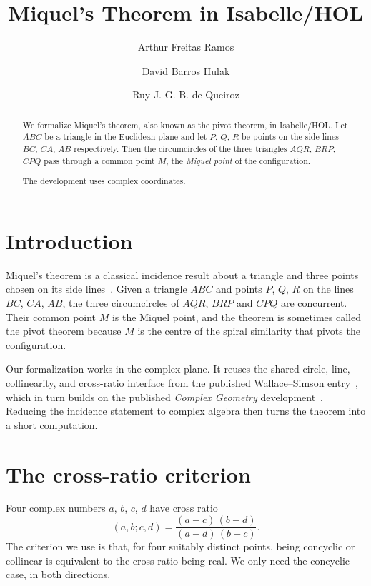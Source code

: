 \documentclass[11pt,a4paper]{article}
\begin{document}
\title{Miquel's Theorem in Isabelle/HOL}
\author{Arthur Freitas Ramos \and David Barros Hulak \and Ruy J. G. B. de Queiroz}
\maketitle

\begin{abstract}
We formalize Miquel's theorem, also known as the pivot theorem, in
Isabelle/HOL.  Let \(ABC\) be a
triangle in the Euclidean plane and let \(P\), \(Q\), \(R\) be points on the
side lines \(BC\), \(CA\), \(AB\) respectively.  Then the circumcircles of the
three triangles \(AQR\), \(BRP\), \(CPQ\) pass through a common point \(M\),
the \emph{Miquel point} of the configuration.

The development uses complex coordinates.
\end{abstract}

\tableofcontents

\section{Introduction}

Miquel's theorem is a classical incidence result about a triangle and three
points chosen on its side lines~\cite{miquel1838,johnson1929,coxeter1967}.
Given a triangle \(ABC\) and points \(P\), \(Q\), \(R\) on the lines \(BC\),
\(CA\), \(AB\), the three circumcircles of \(AQR\), \(BRP\) and \(CPQ\) are
concurrent.  Their common point \(M\) is the Miquel point, and the theorem is
sometimes called the pivot theorem because \(M\) is the centre of the spiral
similarity that pivots the configuration.

Our formalization works in the complex plane.  It reuses the shared circle,
line, collinearity, and cross-ratio interface from the published Wallace--Simson
entry~\cite{Simson-AFP}, which in turn builds on the published \emph{Complex
Geometry} development~\cite{Complex_Geometry-AFP}.  Reducing the incidence
statement to complex algebra then turns the theorem into a short computation.

\section{The cross-ratio criterion}

Four complex numbers \(a\), \(b\), \(c\), \(d\) have cross ratio
\[
  (a,b;c,d) = \frac{(a-c)\,(b-d)}{(a-d)\,(b-c)}.
\]
The criterion we use is that, for four suitably distinct points, being
concyclic or collinear is equivalent to the cross ratio being real.  We only
need the concyclic case, in both directions.
\end{document}
